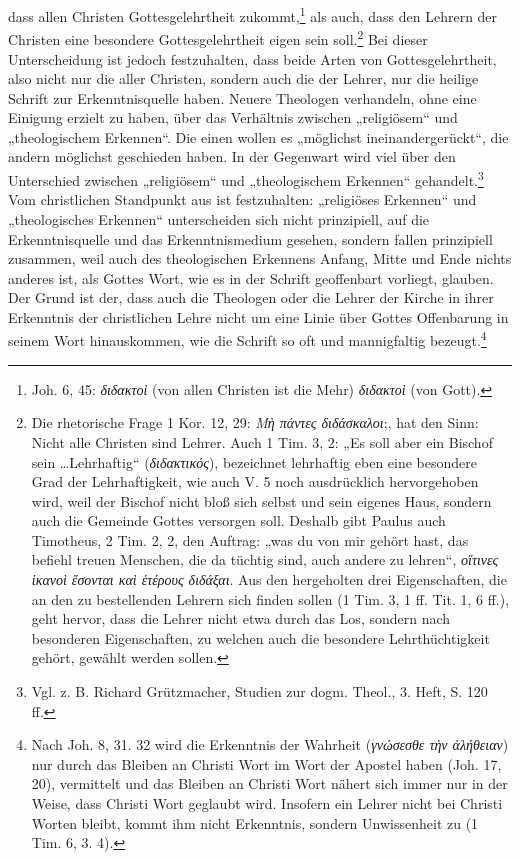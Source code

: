 dass allen Christen Gottesgelehrtheit zukommt,\footnote{Joh. 6, 45: \emph{διδακτοὶ} (von allen Christen ist die Mehr) \emph{διδακτοὶ} (von Gott).} als auch, dass den Lehrern der Christen eine besondere Gottesgelehrtheit eigen sein soll.\footnote{Die rhetorische Frage 1 Kor. 12, 29: \emph{Μὴ πάντες διδάσκαλοι};, hat den Sinn: Nicht alle Christen sind Lehrer. Auch 1 Tim. 3, 2: „Es soll aber ein Bischof sein \dots Lehrhaftig“ (\emph{διδακτικός}), bezeichnet lehrhaftig eben eine besondere Grad der Lehrhaftigkeit, wie auch V. 5 noch ausdrücklich hervorgehoben wird, weil der Bischof nicht bloß sich selbst und sein eigenes Haus, sondern auch die Gemeinde Gottes versorgen soll. Deshalb gibt Paulus auch Timotheus, 2 Tim. 2, 2, den Auftrag: „was du von mir gehört hast, das befiehl treuen Menschen, die da tüchtig sind, auch andere zu lehren“, \emph{οἵτινες ἱκανοὶ ἔσονται καὶ ἑτέρους διδάξαι}. Aus den hergeholten drei Eigenschaften, die an den zu bestellenden Lehrern sich finden sollen (1 Tim. 3, 1 ff. Tit. 1, 6 ff.), geht hervor, dass die Lehrer nicht etwa durch das Los, sondern nach besonderen Eigenschaften, zu welchen auch die besondere Lehrthüchtigkeit gehört, gewählt werden sollen.} Bei dieser Unterscheidung ist jedoch festzuhalten, dass beide Arten von Gottesgelehrtheit, also nicht nur die aller Christen, sondern auch die der Lehrer, nur die heilige Schrift zur Erkenntnisquelle haben. Neuere Theologen verhandeln, ohne eine Einigung erzielt zu haben, über das Verhältnis zwischen „religiösem“ und „theologischem Erkennen“. Die einen wollen es „möglichst ineinandergerückt“, die andern möglichst geschieden haben. In der Gegenwart wird viel über den Unterschied zwischen „religiösem“ und „theologischem Erkennen“ gehandelt.\footnote{Vgl. z. B. Richard Grützmacher, Studien zur dogm. Theol., 3. Heft, S. 120 ff.} Vom christlichen Standpunkt aus ist festzuhalten: „religiöses Erkennen“ und „theologisches Erkennen“ unterscheiden sich nicht prinzipiell, auf die Erkenntnisquelle und das Erkenntnismedium gesehen, sondern fallen prinzipiell zusammen, weil auch des theologischen Erkennens Anfang, Mitte und Ende nichts anderes ist, als Gottes Wort, wie es in der Schrift geoffenbart vorliegt, glauben. Der Grund ist der, dass auch die Theologen oder die Lehrer der Kirche in ihrer Erkenntnis der christlichen Lehre nicht um eine Linie über Gottes Offenbarung in seinem Wort hinauskommen, wie die Schrift so oft und mannigfaltig bezeugt.\footnote{Nach Joh. 8, 31. 32 wird die Erkenntnis der Wahrheit (\emph{γνώσεσθε τὴν ἀλήθειαν}) nur durch das Bleiben an Christi Wort im Wort der Apostel haben (Joh. 17, 20), vermittelt und das Bleiben an Christi Wort nähert sich immer nur in der Weise, dass Christi Wort geglaubt wird. Insofern ein Lehrer nicht bei Christi Worten bleibt, kommt ihm nicht Erkenntnis, sondern Unwissenheit zu (1 Tim. 6, 3. 4).}